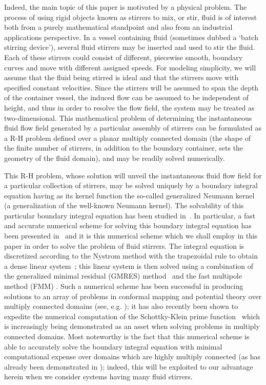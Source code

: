 \documentclass[11pt,a4paper]{article}
\begin{document}
Indeed, the main topic of this paper is motivated by a physical
problem. The process of using rigid objects known as stirrers to mix,
or stir, fluid is of interest both from a purely mathematical
standpoint and also from an industrial applications perspective. In a
vessel containing fluid (sometimes dubbed a ‘batch stirring device’),
several fluid stirrers may be inserted and used to stir the fluid.
Each of these stirrers could consist of different, piecewise smooth,
boundary curves and move with different assigned speeds. For modeling
simplicity, we will assume that the fluid being stirred is ideal and
that the stirrers move with specified constant velocities. Since the
stirrers will be assumed to span the depth of the container vessel,
the induced flow can be assumed to be independent of height, and thus
in order to resolve the flow field, the system may be treated as
two-dimensional. This mathematical problem of
determining the instantaneous fluid flow field generated by a
particular assembly of stirrers can be formulated as a R-H
problem defined over a planar multiply connected domain (the shape of
the finite number of stirrers, in addition to the boundary container,
sets the geometry of the fluid domain), and may be readily solved
numerically.

This R-H problem, whose solution will unveil the
instantaneous fluid flow field for a particular collection of
stirrers, may be solved uniquely by a boundary integral equation
having as its kernel function the so-called generalized Neumann kernel
(a generalization of the well-known Neumann kernel). The solvability
of this particular boundary integral equation has been studied 
in~\cite{wegm,nas-cr}. In particular, a fast
and accurate numerical scheme for solving this boundary integral
equation has been presented in~\cite{NAS-ETNA15} and it is this numerical scheme
which we shall employ in this paper in order to solve the problem of
fluid stirrers. The integral equation is discretized according to the
Nystrom method with the trapezoidal rule to obtain a dense linear 
system~\cite{Atk97,Kre14}; this linear system is then solved 
using a combination of the generalized minimal residual (GMRES) 
method~\cite{sad} and the fast multipole
method (FMM) \cite{gre-gim,gre-rok,rok}. 
Such a numerical scheme has been successful in producing solutions to 
an array of problems in conformal mapping and potential theory over
multiply connected domains (see, e.g. 
\cite{Nas-CMFT09,Nas-SIAM09,Nas-JMAA11,Nas-JMAA13,Nas-SIAM13,nas-lap}); 
it has also recently
been shown to expedite the numerical computation of the Schottky-Klein
prime function~\cite{skpf} which is increasingly being demonstrated as an
asset when solving problems in multiply connected domains. Most
noteworthy is the fact that this numerical scheme is able to
accurately solve the boundary integral equation with minimal
computational expense over domains which are highly multiply connected
(as has already been demonstrated in \cite{NAS-ETNA15,nas-jp}); indeed, this will be
exploited to our advantage herein when we consider systems having many
fluid stirrers.
\end{document}
